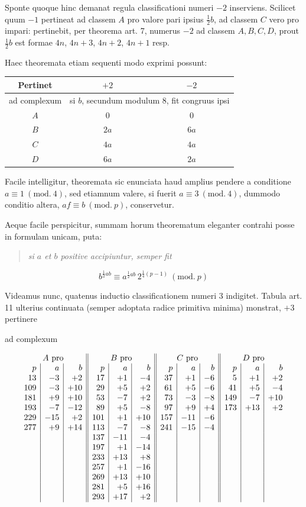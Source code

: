 Sponte quoque hinc demanat regula classificationi numeri $-2$ inserviens. Scilicet quum $-1$ pertineat ad classem $A$ pro valore pari ipsius $\frac12b$, ad classem $C$ vero pro impari: pertinebit, per theorema art. 7, numerus $-2$ ad classem $A,B,C,D$, prout $\frac12b$ est formae $4n$, $4n+3$, $4n+2$, $4n+1$ resp.

Haec theoremata etiam sequenti modo exprimi possunt:

%
\begin{center}
\begin{tabular}{c|c|c}
Pertinet&$+2$&$-2$\\\hline
ad complexum&\multicolumn{2}{c}{si $b$, secundum modulum $8$, fit congruus ipsi}\\\hline
$A$&$0$&$0$\\
$B$&$2a$&$6a$\\
$C$&$4a$&$4a$\\
$D$&$6a$&$2a$
\end{tabular}
\end{center}

Facile intelligitur, theoremata sic enunciata haud amplius pendere a conditione $a\equiv1\ (\mathrm{mod.}\ 4)$, sed etiamnum valere, si fuerit $a\equiv3\ (\mathrm{mod.}\ 4)$, dummodo conditio altera, $af\equiv b\ (\mathrm{mod.}\ p)$, conservetur.

Aeque facile perspicitur, summam horum theorematum eleganter contrahi posse in formulam unicam, puta:
\begin{quote}\itshape si $a$ et $b$ positive accipiuntur, semper fit\end{quote}
\[
b^{\frac12ab}\equiv a^{\frac12ab}\,2^{\frac14(p-1)}\ (\mathrm{mod.}\ p)
\]

Videamus nunc, quatenus inductio classificationem numeri $3$ indigitet. Tabula art. 11 ulterius continuata (semper adoptata radice primitiva minima) monstrat, $+3$ pertinere
\begin{center}ad complexum\end{center}
\[
\begin{array}{r|r|r||r|r|r||r|r|r||r|r|r}
\multicolumn{3}{c||}{A\ \text{pro}}&\multicolumn{3}{c||}{B\ \text{pro}}&\multicolumn{3}{c||}{C\ \text{pro}}&\multicolumn{3}{c}{D\ \text{pro}}\\
p&a&b&p&a&b&p&a&b&p&a&b\\
13&-3&+2&17&+1&-4&37&+1&-6&5&+1&+2\\
109&-3&+10&29&+5&+2&61&+5&-6&41&+5&-4\\
181&+9&+10&53&-7&+2&73&-3&-8&149&-7&+10\\
193&-7&-12&89&+5&-8&97&+9&+4&173&+13&+2\\
229&-15&+2&101&+1&+10&157&-11&-6&&&\\
277&+9&+14&113&-7&-8&241&-15&-4&&&\\
&&&137&-11&-4&&&&&&\\
&&&197&+1&-14&&&&&&\\
&&&233&+13&+8&&&&&&\\
&&&257&+1&-16&&&&&&\\
&&&269&+13&+10&&&&&&\\
&&&281&+5&+16&&&&&&\\
&&&293&+17&+2&&&&&&
\end{array}
\]

